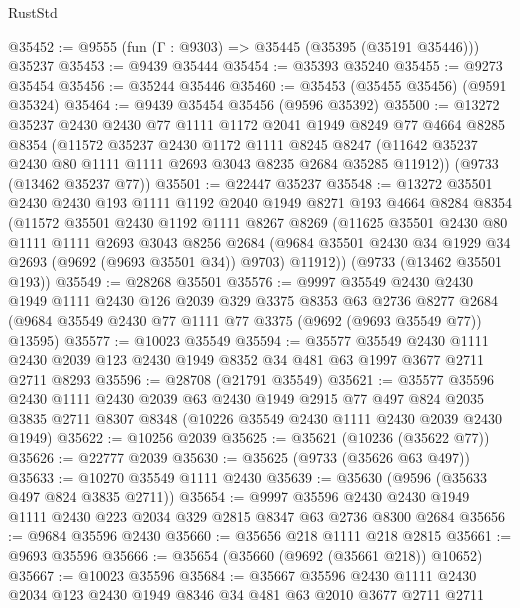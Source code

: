 \begin{lexlean}{RustStd}
\begin{coremodule}
@35452 := @9555 (fun (Γ : @9303) => @35445 (@35395 (@35191 @35446))) @35237
@35453 := @9439 @35444
@35454 := @35393 @35240
@35455 := @9273 @35454
@35456 := @35244 @35446
@35460 := @35453 (@35455 @35456) (@9591 @35324)
@35464 := @9439 @35454 @35456 (@9596 @35392)
@35500 := @13272
    @35237
    @2430
    @2430
    @77
    @1111
    @1172
    @2041
    @1949
    @8249
    @77
    @4664
    @8285
    @8354
    (@11572
      @35237
      @2430
      @1172
      @1111
      @8245
      @8247
      (@11642 @35237 @2430 @80 @1111 @1111 @2693 @3043 @8235 @2684 @35285 @11912))
    (@9733 (@13462 @35237 @77))
@35501 := @22447 @35237
@35548 := @13272
    @35501
    @2430
    @2430
    @193
    @1111
    @1192
    @2040
    @1949
    @8271
    @193
    @4664
    @8284
    @8354
    (@11572
      @35501
      @2430
      @1192
      @1111
      @8267
      @8269
      (@11625
        @35501
        @2430
        @80
        @1111
        @1111
        @2693
        @3043
        @8256
        @2684
        (@9684 @35501 @2430 @34 @1929 @34 @2693 (@9692 (@9693 @35501 @34)) @9703)
        @11912))
    (@9733 (@13462 @35501 @193))
@35549 := @28268 @35501
@35576 := @9997
    @35549
    @2430
    @2430
    @1949
    @1111
    @2430
    @126
    @2039
    @329
    @3375
    @8353
    @63
    @2736
    @8277
    @2684
    (@9684 @35549 @2430 @77 @1111 @77 @3375 (@9692 (@9693 @35549 @77)) @13595)
@35577 := @10023 @35549
@35594 := @35577
    @35549
    @2430
    @1111
    @2430
    @2039
    @123
    @2430
    @1949
    @8352
    @34
    @481
    @63
    @1997
    @3677
    @2711
    @2711
    @8293
@35596 := @28708 (@21791 @35549)
@35621 := @35577
    @35596
    @2430
    @1111
    @2430
    @2039
    @63
    @2430
    @1949
    @2915
    @77
    @497
    @824
    @2035
    @3835
    @2711
    @8307
    @8348
    (@10226 @35549 @2430 @1111 @2430 @2039 @2430 @1949)
@35622 := @10256 @2039
@35625 := @35621 (@10236 (@35622 @77))
@35626 := @22777 @2039
@35630 := @35625 (@9733 (@35626 @63 @497))
@35633 := @10270 @35549 @1111 @2430
@35639 := @35630 (@9596 (@35633 @497 @824 @3835 @2711))
@35654 := @9997
    @35596
    @2430
    @2430
    @1949
    @1111
    @2430
    @223
    @2034
    @329
    @2815
    @8347
    @63
    @2736
    @8300
    @2684
@35656 := @9684 @35596 @2430
@35660 := @35656 @218 @1111 @218 @2815
@35661 := @9693 @35596
@35666 := @35654 (@35660 (@9692 (@35661 @218)) @10652)
@35667 := @10023 @35596
@35684 := @35667
    @35596
    @2430
    @1111
    @2430
    @2034
    @123
    @2430
    @1949
    @8346
    @34
    @481
    @63
    @2010
    @3677
    @2711
    @2711

\end{coremodule}
\end{lexlean}
